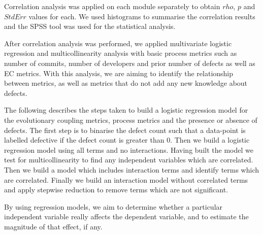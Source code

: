 \documentclass[times]{smrauth}
\begin{document}
Correlation analysis was applied on each module separately to obtain $rho$, $p$ and $StdErr$ values for each. We used histograms to summarise the correlation results and the SPSS \cite{SPSS:2013:Online} tool was used for the statistical analysis.

After correlation analysis was performed, we applied multivariate logistic regression and multicollinearity analysis with basic process metrics such as number of commits, number of developers and prior number of defects as well as EC metrics. With this analysis, we are aiming to identify the relationship between metrics, as well as metrics that do not add any new knowledge about defects.  

The following describes the steps taken to build a logistic regression model for the evolutionary coupling metrics, process metrics and the presence or absence of defects. The first step is to binarise the defect count such that a data-point is labelled defective if the defect count is greater than 0. Then we build a logistic regression model using all terms and no interactions.  Having built the model we test for multicollinearity to find any independent variables which are correlated. %
Then we build a model which includes interaction terms and identify terms which are correlated.  Finally we build an interaction model without correlated terms and apply stepwise reduction to remove terms which are not significant.


By using regression models, we aim to determine whether a particular independent variable really affects the dependent variable, and to estimate the magnitude of that effect, if any.

\end{document}
